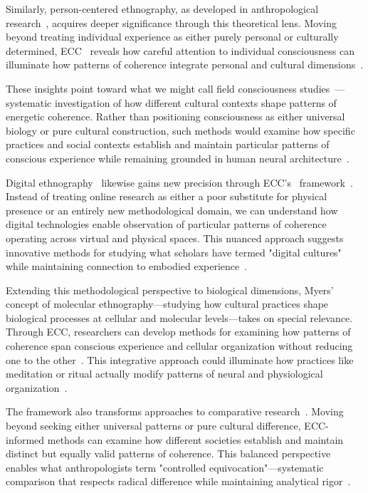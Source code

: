 Similarly, person-centered ethnography, as developed in anthropological research~\cite{hollan2000constructivist}, acquires deeper significance through this theoretical lens. Moving beyond treating individual experience as either purely personal or culturally determined, ECC~ reveals how careful attention to individual consciousness can illuminate how patterns of coherence integrate personal and cultural dimensions~\cite{throop2003articulating}.

These insights point toward what we might call field consciousness studies~\cite{myers2015rendering}---systematic investigation of how different cultural contexts shape patterns of energetic coherence. Rather than positioning consciousness as either universal biology or pure cultural construction, such methods would examine how specific practices and social contexts establish and maintain particular patterns of conscious experience while remaining grounded in human neural architecture~\cite{lakoff1999philosophy}.

Digital ethnography~ likewise gains new precision through ECC's~ framework~\cite{pink2016digital, horst2012digital}. Instead of treating online research as either a poor substitute for physical presence or an entirely new methodological domain, we can understand how digital technologies enable observation of particular patterns of coherence operating across virtual and physical spaces. This nuanced approach suggests innovative methods for studying what scholars have termed "digital cultures" while maintaining connection to embodied experience~\cite{knox2016digital, hayles2012how}.

Extending this methodological perspective to biological dimensions, Myers'~\cite{myers2015rendering} concept of molecular ethnography---studying how cultural practices shape biological processes at cellular and molecular levels---takes on special relevance. Through ECC, researchers can develop methods for examining how patterns of coherence span conscious experience and cellular organization without reducing one to the other~\cite{ingold2013making}. This integrative approach could illuminate how practices like meditation or ritual actually modify patterns of neural and physiological organization~\cite{xygalatas2013burning}.

The framework also transforms approaches to comparative research~\cite{marcus2012multi, strathern2004partial}. Moving beyond seeking either universal patterns or pure cultural difference, ECC-informed methods can examine how different societies establish and maintain distinct but equally valid patterns of coherence. This balanced perspective enables what anthropologists term "controlled equivocation"---systematic comparison that respects radical difference while maintaining analytical rigor~\cite{evans1937witchcraft}.

